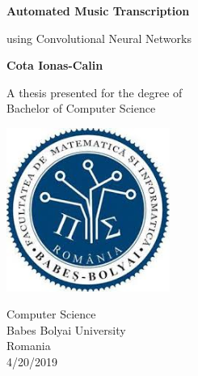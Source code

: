\begin{titlepage}
   \begin{center}
       \vspace*{1cm}
       
       \Huge
       \textbf{Automated Music Transcription}
 
       \vspace{0.5cm}
       \LARGE
       using Convolutional Neural Networks
 
       \vspace{1.5cm}
 
       \textbf{Cota Ionas-Calin}
 
       \vfill
 
       A thesis presented for the degree of\\
       Bachelor of Computer Science
 
       \vspace{0.8cm}
 
       \includegraphics[width=0.4\textwidth]{"Resources/ubb_logo"}
      
       \Large
       Computer Science\\
       Babes Bolyai University\\
       Romania\\
       4/20/2019
 
   \end{center}
\end{titlepage}